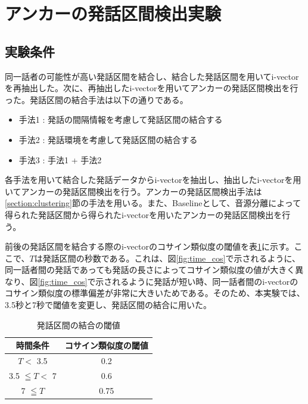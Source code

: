 \section{アンカーの発話区間検出実験}
\label{chapter:get_anchor}

\subsection{実験条件}
同一話者の可能性が高い発話区間を結合し、結合した発話区間を用いてi-vectorを再抽出した。次に、再抽出したi-vectorを用いてアンカーの発話区間検出を行った。発話区間の結合手法は以下の通りである。

\begin{itemize}
\item 手法1 : 発話の間隔情報を考慮して発話区間の結合する
\item 手法2 : 発話環境を考慮して発話区間の結合する
\item 手法3 : 手法1 + 手法2
\end{itemize}

各手法を用いて結合した発話データからi-vectorを抽出し、抽出したi-vectorを用いてアンカーの発話区間検出を行う。アンカーの発話区間検出手法は\ref{section:clustering}節の手法を用いる。また、Baselineとして、音源分離によって得られた発話区間から得られたi-vectorを用いたアンカーの発話区間検出を行う。


前後の発話区間を結合する際のi-vectorのコサイン類似度の閾値を表\ref{table:decide_thcos}に示す。ここで、$T$は発話区間の秒数である。これは、図\ref{fig:time_cos}で示されるように、同一話者間の発話であっても発話の長さによってコサイン類似度の値が大きく異なり、図\ref{fig:time_cos}で示されるように発話が短い時、同一話者間のi-vectorのコサイン類似度の標準偏差が非常に大きいためである。そのため、本実験では、3.5秒と7秒で閾値を変更し、発話区間の結合に用いた。

\begin{table}[H]
  \begin{center}
    \caption{発話区間の結合の閾値 \label{table:decide_thcos}}
    \begin{tabular}{|c||c|} \hline
時間条件 & コサイン類似度の閾値  \\ \hline
$T <$ 3.5 &  0.2 \\ \hline
3.5 $\leqq T <$ 7 &  0.6  \\ \hline
7 $\leqq T$ &  0.75 \\ \hline
    \end{tabular}
  \end{center}
\end{table}

